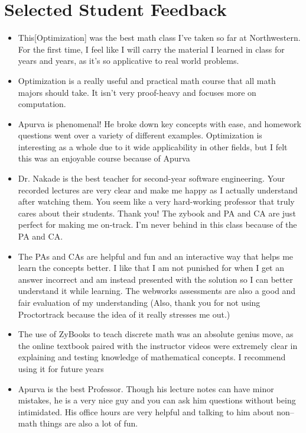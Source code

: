 \documentclass[10pt]{amsbook}
\begin{document}
  \section*{Selected Student Feedback}
  \begin{itemize}
    \item This[Optimization] was the best math class I've taken so far at Northwestern. For the first time, I feel like I will carry the material I learned in class
    for years and years, as it's so applicative to real world problems. 
    \item Optimization is a really useful and practical math course that all math majors should take. It isn't very proof-heavy and focuses
    more on computation.    
    \item Apurva is phenomenal! He broke down key concepts with ease, and homework questions went over a variety of different examples.
    Optimization is interesting as a whole due to it wide applicability in other fields, but I felt this was an enjoyable course because of
    Apurva
    \item Dr. Nakade is the best teacher for second-year software engineering. Your recorded lectures are very clear and make me happy as I
    actually understand after watching them. You seem like a very hard-working professor that truly cares about their students. Thank you!
    The zybook and PA and CA are just perfect for making me on-track. I'm never behind in this class because of the PA and CA.
    \item The PAs and CAs are helpful and
    fun and an interactive way that helps me learn the concepts better. I like that I am not punished for when I get an answer incorrect and
    am instead presented with the solution so I can better understand it while learning. The webworks assessments are also a good and
    fair evaluation of my understanding 
    (Also, thank you for not using Proctortrack because the idea of it really stresses me out.)
    \item The use of ZyBooks to teach discrete math was an absolute genius move, as the online textbook paired with the instructor videos were
    extremely clear in explaining and testing knowledge of mathematical concepts. I recommend using it for future years
    \item Apurva is the best Professor. Though his lecture notes can have minor mistakes, he is a very nice guy and you can ask him
    questions without being intimidated. His office hours are very helpful and talking to him about non–math things are also a lot of fun.

\end{itemize}
\end{document}
